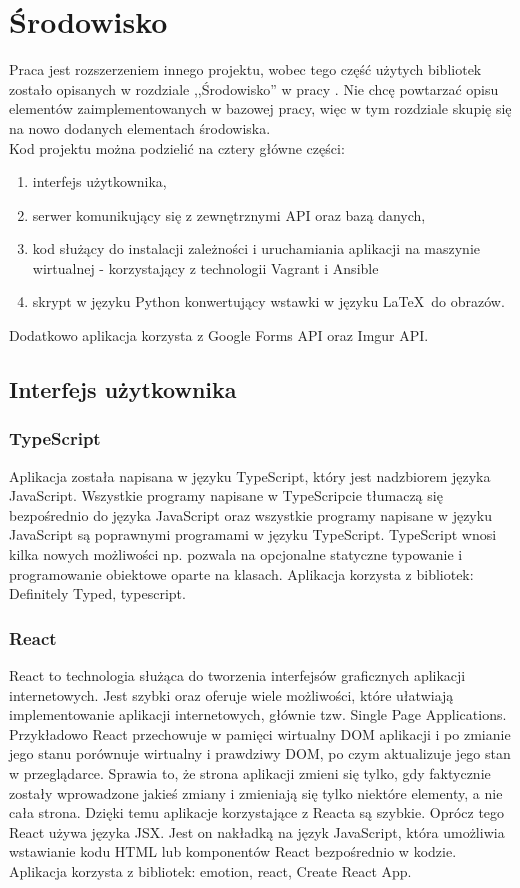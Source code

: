 \chapter{Środowisko}
Praca jest rozszerzeniem innego projektu, wobec tego część użytych bibliotek zostało opisanych 
w rozdziale ,,Środowisko'' w pracy \ap. Nie chcę powtarzać opisu elementów zaimplementowanych 
w bazowej pracy, więc w tym rozdziale skupię się na nowo dodanych
elementach środowiska.
\\ Kod projektu można podzielić na cztery główne części:
\begin{enumerate}
  \item interfejs użytkownika,
  \item serwer komunikujący się z zewnętrznymi API oraz bazą danych,
  \item kod służący do instalacji zależności i uruchamiania aplikacji na maszynie wirtualnej 
  - korzystający z technologii Vagrant i Ansible
  \item skrypt w języku Python konwertujący wstawki w języku \LaTeX\ do obrazów.
\end{enumerate}
Dodatkowo aplikacja korzysta z Google Forms API oraz Imgur API.

\section{Interfejs użytkownika}

\subsection{TypeScript}
Aplikacja została napisana w języku TypeScript\cite{TypeScript},
który jest nadzbiorem języka JavaScript. 
Wszystkie programy napisane w TypeScripcie tłumaczą się bezpośrednio do języka JavaScript
oraz wszystkie programy napisane w języku JavaScript są poprawnymi programami w języku TypeScript.
TypeScript wnosi kilka nowych możliwości np. pozwala na opcjonalne statyczne typowanie 
i programowanie obiektowe oparte na klasach. 
Aplikacja korzysta z bibliotek: Definitely Typed\cite{DefinitelyTyped}, typescript\cite{typescript_}.

\subsection{React}
React\cite{React} to technologia służąca do tworzenia interfejsów
graficznych aplikacji internetowych. Jest szybki oraz oferuje wiele możliwości,
które ułatwiają implementowanie aplikacji internetowych, głównie tzw. Single Page Applications.
Przykładowo React przechowuje w pamięci wirtualny DOM aplikacji i po zmianie jego stanu porównuje
wirtualny i prawdziwy DOM, po czym aktualizuje jego stan w przeglądarce. Sprawia to, że strona
aplikacji zmieni się tylko, gdy faktycznie zostały wprowadzone jakieś zmiany
i zmieniają się tylko niektóre elementy,
a nie cała strona. Dzięki temu aplikacje korzystające z Reacta są szybkie.
Oprócz tego React używa języka JSX. Jest on nakładką na język JavaScript, która umożliwia
wstawianie kodu HTML lub komponentów React bezpośrednio w kodzie. 
Aplikacja korzysta z bibliotek:
emotion\cite{emotion}, react\cite{react_}, Create React App\cite{CreateReactApp}.

